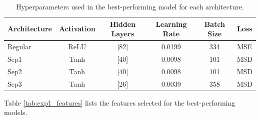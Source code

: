 \begin{table}[!htbp]
    \centering
    \caption[Selected hyperparameters for each neural network pointing model architecture]{Hyperparameters used in the best-performing model for each architecture.}
    \begin{tabular}{lccccc}
        \toprule
        Architecture & Activation & Hidden Layers & Learning Rate & Batch Size & Loss \\
        \midrule
        Regular &  ReLU & [82] & 0.0199 & 334 & MSE \\
        Sep1    &  Tanh & [40] & 0.0098 & 101 & MSD \\
        Sep2    &  Tanh & [40] & 0.0098 & 101 & MSD \\
        Sep3    &  Tanh & [26] & 0.0039 & 358 & MSD \\
        \bottomrule
    \end{tabular}
    \label{tab:exp1_hyperparameters_best_model}
\end{table}



Table \ref{tab:exp1_features} lists the features selected for the best-performing models.


